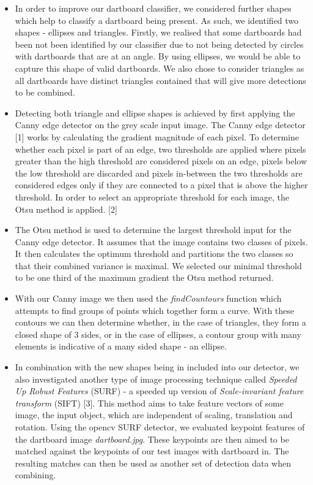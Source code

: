 \documentclass[a4paper]{article}
\begin{document}
\begin{itemize}
\item In order to improve our dartboard classifier, we considered further
  shapes which help to classify a dartboard being present.  As such, we
    identified two shapes - ellipses and triangles. Firstly, we realised that
    some dartboards had been not been identified by our classifier due to not
    being detected by circles with dartboards that are at an angle. By using
    ellipses, we would be able to capture this shape of valid dartboards. We
    also chose to consider triangles as all dartboards have distinct triangles
    contained that will give more detections to be combined.

\item Detecting both triangle and ellipse shapes is achieved by first applying
  the Canny edge detector on the grey scale input image. The Canny edge
    detector [1] works by calculating the gradient magnitude of each pixel. To
    determine whether each pixel is part of an edge, two thresholds are applied
    where pixels greater than the high threshold are considered pixels on an
    edge, pixels below the low threshold are discarded and pixels in-between
    the two thresholds are considered edges only if they are connected to a
    pixel that is above the higher threshold.  In order to select an
    appropriate threshold for each image, the Otsu method is applied.  [2]

\item The Otsu method is used to determine the largest threshold input for the
  Canny edge detector. It assumes that the image contains two classes of
    pixels. It then calculates the optimum threshold and partitions the two
    classes so that their combined variance is maximal. We selected our minimal
    threshold to be one third of the maximum gradient the Otsu method returned.

\item With our Canny image we then used the \textit{findCountours} function
  which attempts to find groups of points which together form a curve. With
    these contours we can then determine whether, in the case of triangles,
    they form a closed shape of 3 sides, or in the case of ellipses, a contour
    group with many elements is indicative of a many sided shape - an ellipse.

\item In combination with the new shapes being in included into our detector,
  we also investigated another type of image processing technique called
    \textit{Speeded Up Robust Features} (SURF) - a speeded up version of
    \textit{Scale-invariant feature transform} (SIFT) [3]. This method aims to
    take feature vectors of some image, the input object, which are independent
    of scaling, translation and rotation. Using the opencv SURF detector, we
    evaluated keypoint features of the dartboard image \textit{dartboard.jpg}.
    These keypoints are then aimed to be matched against the keypoints of our
    test images with dartboard in. The resulting matches can then be used as
    another set of detection data when combining.


\end{itemize}
\end{document}
